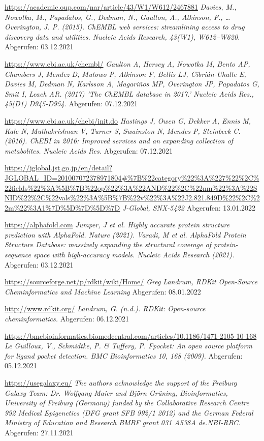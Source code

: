 \begin{thebibliography}{1}
\url{https://academic.oup.com/nar/article/43/W1/W612/2467881} \emph{Davies, M., Nowotka, M., Papadatos, G., Dedman, N., Gaulton, A., Atkinson, F., … Overington, J. P. (2015). ChEMBL web services: streamlining access to drug discovery data and utilities. Nucleic Acids Research, 43(W1), W612–W620.}
Abgerufen: 03.12.2021

\url{https://www.ebi.ac.uk/chembl/} \emph{Gaulton A, Hersey A, Nowotka M, Bento AP, Chambers J, Mendez D, Mutowo P, Atkinson F, Bellis LJ, Cibrián-Uhalte E, Davies M, Dedman N, Karlsson A, Magariños MP, Overington JP, Papadatos G, Smit I, Leach AR. (2017) 'The ChEMBL database in 2017.' Nucleic Acids Res., 45(D1) D945-D954.}
Abgerufen: 07.12.2021

\url{https://www.ebi.ac.uk/chebi/init.do} \emph{Hastings J, Owen G, Dekker A, Ennis M, Kale N, Muthukrishnan V, Turner S, Swainston N, Mendes P, Steinbeck C. (2016). ChEBI in 2016: Improved services and an expanding collection of metabolites. Nucleic Acids Res.}
Abgerufen: 07.12.2021

\url{https://jglobal.jst.go.jp/en/detail?JGLOBAL_ID=201007072378971804#%7B%22category%22%3A%227%22%2C%22fields%22%3A%5B%7B%22op%22%3A%22AND%22%2C%22nm%22%3A%22SNID%22%2C%22vals%22%3A%5B%7B%22v%22%3A%22J2.821.849D%22%2C%22m%22%3A1%7D%5D%7D%5D%7D} \emph{J-Global, SNX-5422}
Abgerufen: 13.01.2022

\url{https://alphafold.com} \emph{Jumper, J et al. Highly accurate protein structure prediction with AlphaFold. Nature (2021). Varadi, M et al. AlphaFold Protein Structure Database: massively expanding the structural coverage of protein-sequence space with high-accuracy models. Nucleic Acids Research (2021).}
Abgerufen: 03.12.2021

\url{https://sourceforge.net/p/rdkit/wiki/Home/} \emph{Greg Landrum, RDKit Open-Source Cheminformatics and Machine Learning}
Abgerufen: 08.01.2022

\url{http://www.rdkit.org/} \emph{Landrum, G. (n.d.). RDKit: Open-source cheminformatics.}
Abgerufen: 06.12.2021

\url{https://bmcbioinformatics.biomedcentral.com/articles/10.1186/1471-2105-10-168} \emph{Le Guilloux, V., Schmidtke, P. & Tuffery, P. Fpocket: An open source platform for ligand pocket detection. BMC Bioinformatics 10, 168 (2009).}
Abgerufen: 05.12.2021

\url{https://usegalaxy.eu/} \emph{The authors acknowledge the support of the Freiburg Galaxy Team: Dr. Wolfgang Maier and Björn Grüning, Bioinformatics, University of Freiburg (Germany) funded by the Collaborative Research Centre 992 Medical Epigenetics (DFG grant SFB 992/1 2012) and the German Federal Ministry of Education and Research BMBF grant 031 A538A de.NBI-RBC.}
Abgerufen: 27.11.2021


\end{thebibliography}
